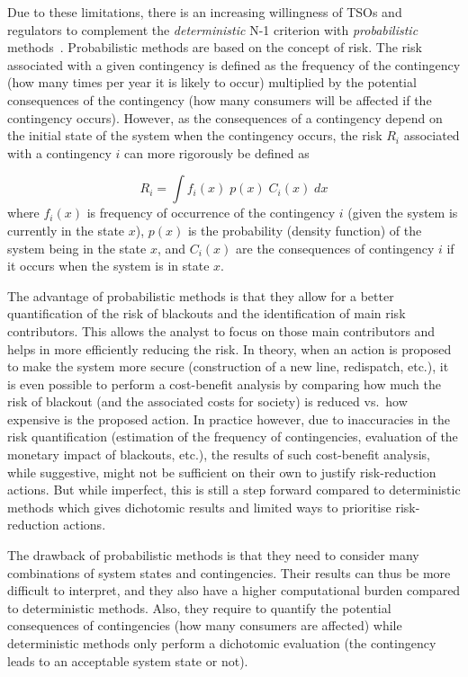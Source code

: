 Due to these limitations, there is an increasing willingness of TSOs and regulators to complement the \emph{deterministic} N-1 criterion with \emph{probabilistic} methods~\cite{ACER}. Probabilistic methods are based on the concept of risk. The risk associated with a given contingency is defined as the frequency of the contingency (how many times per year it is likely to occur) multiplied by the potential consequences of the contingency (\eg how many consumers will be affected if the contingency occurs). However, as the consequences of a contingency depend on the initial state of the system when the contingency occurs, the risk \(R_i\) associated with a contingency \(i\) can more rigorously be defined as

\begin{equation}
    \label{eq:risk}
    {R_i = \int f_i(x) \; p(x) \; C_i(x) \; dx}
\end{equation}
\noindent where \(f_i(x)\) is frequency of occurrence of the contingency \(i\) (given the system is currently in the state \(x\)), \(p(x)\) is the probability (density function) of the system being in the state \(x\), and \(C_i(x)\) are the consequences of contingency \(i\) if it occurs when the system is in state \(x\).

The advantage of probabilistic methods is that they allow for a better quantification of the risk of blackouts and the identification of main risk contributors. This allows the analyst to focus on those main contributors and helps in more efficiently reducing the risk. In theory, when an action is proposed to make the system more secure (construction of a new line, redispatch, etc.), it is even possible to perform a cost-benefit analysis by comparing how much the risk of blackout (and the associated costs for society) is reduced vs.\ how expensive is the proposed action. In practice however, due to inaccuracies in the risk quantification (estimation of the frequency of contingencies, evaluation of the monetary impact of blackouts, etc.), the results of such cost-benefit analysis, while suggestive, might not be sufficient on their own to justify risk-reduction actions. But while imperfect, this is still a step forward compared to deterministic methods which gives dichotomic results and limited ways to prioritise risk-reduction actions.

The drawback of probabilistic methods is that they need to consider many combinations of system states and contingencies. Their results can thus be more difficult to interpret, and they also have a higher computational burden compared to deterministic methods. Also, they require to quantify the potential consequences of contingencies (\eg how many consumers are affected) while deterministic methods only perform a dichotomic evaluation (the contingency leads to an acceptable system state or not).

